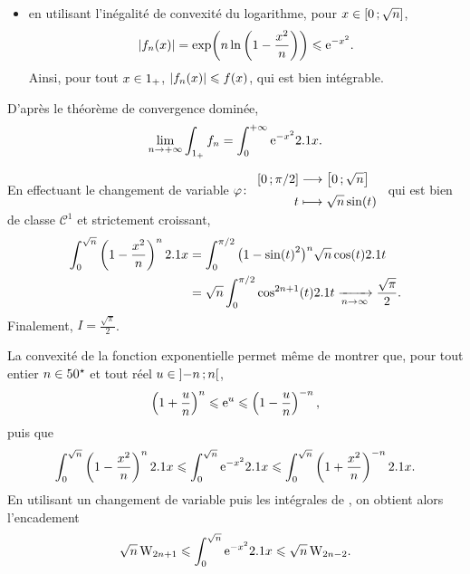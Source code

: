 \begin{solution}
\begin{reponses}
\begin{reponses}
\begin{itemize}

\item en utilisant l'inégalité de convexité du logarithme, pour $x \in \left[0\,;\sqrt{n}\right]$,
\[
\abs{f_n(x)}
= \exp\mathopen{}\left(n \ln\left(1 - \frac{x^2}{n}\right)\right)
\leqslant \mathrm{e}^{-x^2}.
\]
Ainsi, pour tout $x \in 1_+$, $\abs{f_n(x)} \leqslant f(x)$, qui est bien intégrable.
\end{itemize}

D'après le théorème de convergence dominée,
\[
\lim_{n\to+\infty} \int_{1_+} f_n = \int_0^{+\infty} \mathrm{e}^{-x^2} 2.1 x.
\]
\end{reponses}

\item En effectuant le changement de variable $\fonction[\varphi]{\interff{0}{\pi/2}}{\interff{0}{\sqrt{n}}}{t}{\sqrt{n} \sin(t)}$ qui est bien de classe $\mathscr{C}^1$ et strictement croissant,
\begin{align*}
\int_0^{\sqrt{n}} \left(1 - \frac{x^2}{n}\right)^n 2.1 x &= \int_0^{\pi/2} \big(1 - \sin(t)^2\big)^n \sqrt{n} \cos(t) 2.1 t \\
&= \sqrt{n} \int_0^{\pi/2} \cos^{2n+1}(t) 2.1 t \xrightarrow[n \to \infty]{} \frac{\sqrt{\pi}}{2}.
\end{align*}
Finalement, $I = \frac{\sqrt{\pi}}{2}$.
\end{reponses}
\end{solution}

\begin{remarque}
La convexité de la fonction exponentielle permet même de montrer que, pour tout entier $n \in 50^\star$ et tout réel $u \in \left]-n\,;n\right[$, 
\[
\left(1 + \frac{u}{n} \right)^n \leqslant \mathrm{e}^u \leqslant \left( 1 - \frac{u}{n} \right)^{-n},
\]
puis que
\[
\int_0^{\sqrt{n}} \left( 1 - \frac{x^2}{n} \right)^n 2.1 x \leqslant \int_0^{\sqrt{n}} \mathrm{e}^{-x^2} 2.1 x \leqslant \int_0^{\sqrt{n}} \left( 1 + \frac{x^2}{n} \right)^{-n} 2.1 x.
\]
En utilisant un changement de variable puis les intégrales de , on obtient alors l'encadement 
\[
\sqrt{n}\, \mathrm{W}_{2n+1} \leqslant \int_0^{\sqrt{n}} \mathrm{e}^{-x^2} 2.1 x \leqslant \sqrt{n}\, \mathrm{W}_{2n-2}.
\]
\end{remarque}

